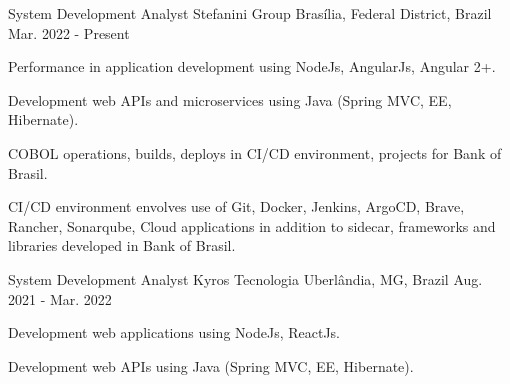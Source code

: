 

\begin{cventries}

\cventry
    {System Development Analyst} %
    {Stefanini Group} %
    {Brasília, Federal District, Brazil} %
    {Mar. 2022 - Present} %
    {
      \begin{cvitems} %
        \item {Performance in application development using NodeJs, AngularJs, Angular 2+.}
        \item {Development web APIs and microservices using Java (Spring MVC, EE, Hibernate).}
        \item {COBOL operations, builds, deploys in CI/CD environment, projects for Bank of Brasil.}
        \item {CI/CD environment envolves use of Git, Docker, Jenkins, ArgoCD, Brave, Rancher, Sonarqube, Cloud applications in addition to sidecar, frameworks and libraries developed in Bank of Brasil.}
      \end{cvitems}
    }


    \cventry
    {System Development Analyst} %
    {Kyros Tecnologia} %
    {Uberlândia, MG, Brazil} %
    {Aug. 2021 - Mar. 2022} %
    {
      \begin{cvitems} %
        \item {Development web applications using NodeJs, ReactJs.}
        \item {Development web APIs using Java (Spring MVC, EE, Hibernate).}       
      \end{cvitems}
    }


\end{cventries}
